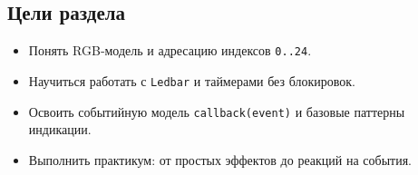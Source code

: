 \subsection*{Цели раздела}
\begin{itemize}
  \item Понять RGB‑модель и адресацию индексов \texttt{0..24}.
  \item Научиться работать с \texttt{Ledbar} и таймерами без блокировок.
  \item Освоить событийную модель \texttt{callback(event)} и базовые паттерны индикации.
  \item Выполнить практикум: от простых эффектов до реакций на события.
\end{itemize}
